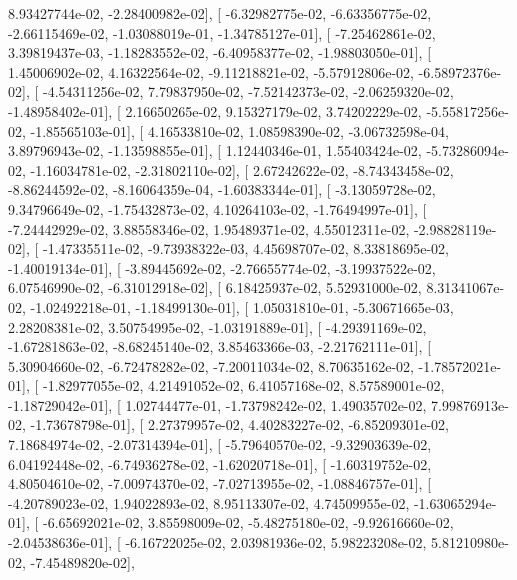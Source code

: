\documentclass{article}
\begin{document}
          8.93427744e-02,  -2.28400982e-02],
       [ -6.32982775e-02,  -6.63356775e-02,  -2.66115469e-02,
         -1.03088019e-01,  -1.34785127e-01],
       [ -7.25462861e-02,   3.39819437e-03,  -1.18283552e-02,
         -6.40958377e-02,  -1.98803050e-01],
       [  1.45006902e-02,   4.16322564e-02,  -9.11218821e-02,
         -5.57912806e-02,  -6.58972376e-02],
       [ -4.54311256e-02,   7.79837950e-02,  -7.52142373e-02,
         -2.06259320e-02,  -1.48958402e-01],
       [  2.16650265e-02,   9.15327179e-02,   3.74202229e-02,
         -5.55817256e-02,  -1.85565103e-01],
       [  4.16533810e-02,   1.08598390e-02,  -3.06732598e-04,
          3.89796943e-02,  -1.13598855e-01],
       [  1.12440346e-01,   1.55403424e-02,  -5.73286094e-02,
         -1.16034781e-02,  -2.31802110e-02],
       [  2.67242622e-02,  -8.74343458e-02,  -8.86244592e-02,
         -8.16064359e-04,  -1.60383344e-01],
       [ -3.13059728e-02,   9.34796649e-02,  -1.75432873e-02,
          4.10264103e-02,  -1.76494997e-01],
       [ -7.24442929e-02,   3.88558346e-02,   1.95489371e-02,
          4.55012311e-02,  -2.98828119e-02],
       [ -1.47335511e-02,  -9.73938322e-03,   4.45698707e-02,
          8.33818695e-02,  -1.40019134e-01],
       [ -3.89445692e-02,  -2.76655774e-02,  -3.19937522e-02,
          6.07546990e-02,  -6.31012918e-02],
       [  6.18425937e-02,   5.52931000e-02,   8.31341067e-02,
         -1.02492218e-01,  -1.18499130e-01],
       [  1.05031810e-01,  -5.30671665e-03,   2.28208381e-02,
          3.50754995e-02,  -1.03191889e-01],
       [ -4.29391169e-02,  -1.67281863e-02,  -8.68245140e-02,
          3.85463366e-03,  -2.21762111e-01],
       [  5.30904660e-02,  -6.72478282e-02,  -7.20011034e-02,
          8.70635162e-02,  -1.78572021e-01],
       [ -1.82977055e-02,   4.21491052e-02,   6.41057168e-02,
          8.57589001e-02,  -1.18729042e-01],
       [  1.02744477e-01,  -1.73798242e-02,   1.49035702e-02,
          7.99876913e-02,  -1.73678798e-01],
       [  2.27379957e-02,   4.40283227e-02,  -6.85209301e-02,
          7.18684974e-02,  -2.07314394e-01],
       [ -5.79640570e-02,  -9.32903639e-02,   6.04192448e-02,
         -6.74936278e-02,  -1.62020718e-01],
       [ -1.60319752e-02,   4.80504610e-02,  -7.00974370e-02,
         -7.02713955e-02,  -1.08846757e-01],
       [ -4.20789023e-02,   1.94022893e-02,   8.95113307e-02,
          4.74509955e-02,  -1.63065294e-01],
       [ -6.65692021e-02,   3.85598009e-02,  -5.48275180e-02,
         -9.92616660e-02,  -2.04538636e-01],
       [ -6.16722025e-02,   2.03981936e-02,   5.98223208e-02,
          5.81210980e-02,  -7.45489820e-02],
\end{document}
